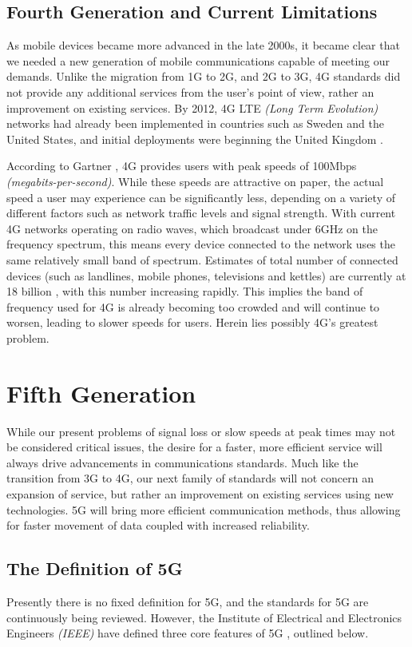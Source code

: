 \documentclass[journal]{IEEEtran}
\begin{document}
\subsection{Fourth Generation and Current Limitations} \label{subsec:4g}
As mobile devices became more advanced in the late 2000s, it became clear that we needed a new generation of mobile communications capable of meeting our demands. Unlike the migration from 1G to 2G, and 2G to 3G, 4G standards did not provide any additional services from the user's point of view, rather an improvement on existing services. By 2012, 4G LTE \textit{(Long Term Evolution)} networks had already been implemented in countries such as Sweden and the United States, and initial deployments were beginning the United Kingdom \cite{bbc4g}. 

According to Gartner \cite{gartner4g}, 4G provides users with peak speeds of 100Mbps \textit{(megabits-per-second)}. While these speeds are attractive on paper, the actual speed a user may experience can be significantly less, depending on a variety of different factors such as network traffic levels and signal strength. With current 4G networks operating on radio waves, which broadcast under 6GHz on the frequency spectrum, this means every device connected to the network uses the same relatively small band of spectrum. Estimates of total number of connected devices (such as landlines, mobile phones, televisions and kettles) are currently at 18 billion \cite{ericssondev}, with this number increasing rapidly. This implies the band of frequency used for 4G is already becoming too crowded and will continue to worsen, leading to slower speeds for users. Herein lies possibly 4G's greatest problem.

\section{Fifth Generation}
While our present problems of signal loss or slow speeds at peak times may not be considered critical issues, the desire for a faster, more efficient service will always drive advancements in communications standards. Much like the transition from 3G to 4G, our next family of standards will not concern an expansion of service, but rather an improvement on existing services using new technologies. 5G will bring more efficient communication methods, thus allowing for faster movement of data coupled with increased reliability.

\subsection{The Definition of 5G} \label{subsec:def5g}
Presently there is no fixed definition for 5G, and the standards for 5G are continuously being reviewed. However, the Institute of Electrical and Electronics Engineers \textit{(IEEE)} have defined three core features of 5G \cite{ieee5g}, outlined below. 
\end{document}
